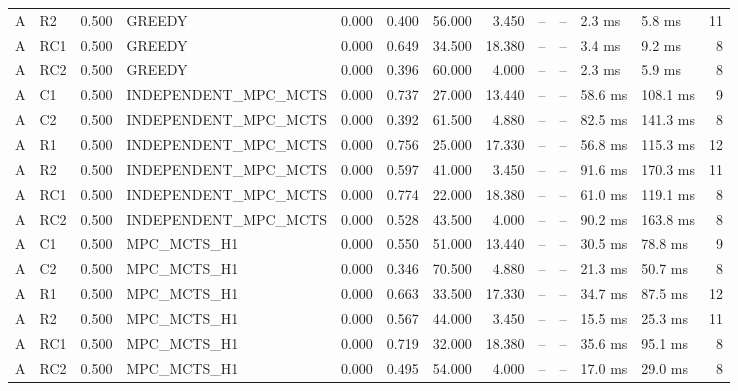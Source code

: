 \begin{table}
{\begin{tabular}{llrlrrrrrrllr}
A & R2 & 0.500 & GREEDY & 0.000 & 0.400 & 56.000 & 3.450 & -- & -- & 2.3 ms & 5.8 ms & 11 \\
A & RC1 & 0.500 & GREEDY & 0.000 & 0.649 & 34.500 & 18.380 & -- & -- & 3.4 ms & 9.2 ms & 8 \\
A & RC2 & 0.500 & GREEDY & 0.000 & 0.396 & 60.000 & 4.000 & -- & -- & 2.3 ms & 5.9 ms & 8 \\
A & C1 & 0.500 & INDEPENDENT\_MPC\_MCTS & 0.000 & 0.737 & 27.000 & 13.440 & -- & -- & 58.6 ms & 108.1 ms & 9 \\
A & C2 & 0.500 & INDEPENDENT\_MPC\_MCTS & 0.000 & 0.392 & 61.500 & 4.880 & -- & -- & 82.5 ms & 141.3 ms & 8 \\
A & R1 & 0.500 & INDEPENDENT\_MPC\_MCTS & 0.000 & 0.756 & 25.000 & 17.330 & -- & -- & 56.8 ms & 115.3 ms & 12 \\
A & R2 & 0.500 & INDEPENDENT\_MPC\_MCTS & 0.000 & 0.597 & 41.000 & 3.450 & -- & -- & 91.6 ms & 170.3 ms & 11 \\
A & RC1 & 0.500 & INDEPENDENT\_MPC\_MCTS & 0.000 & 0.774 & 22.000 & 18.380 & -- & -- & 61.0 ms & 119.1 ms & 8 \\
A & RC2 & 0.500 & INDEPENDENT\_MPC\_MCTS & 0.000 & 0.528 & 43.500 & 4.000 & -- & -- & 90.2 ms & 163.8 ms & 8 \\
A & C1 & 0.500 & MPC\_MCTS\_H1 & 0.000 & 0.550 & 51.000 & 13.440 & -- & -- & 30.5 ms & 78.8 ms & 9 \\
A & C2 & 0.500 & MPC\_MCTS\_H1 & 0.000 & 0.346 & 70.500 & 4.880 & -- & -- & 21.3 ms & 50.7 ms & 8 \\
A & R1 & 0.500 & MPC\_MCTS\_H1 & 0.000 & 0.663 & 33.500 & 17.330 & -- & -- & 34.7 ms & 87.5 ms & 12 \\
A & R2 & 0.500 & MPC\_MCTS\_H1 & 0.000 & 0.567 & 44.000 & 3.450 & -- & -- & 15.5 ms & 25.3 ms & 11 \\
A & RC1 & 0.500 & MPC\_MCTS\_H1 & 0.000 & 0.719 & 32.000 & 18.380 & -- & -- & 35.6 ms & 95.1 ms & 8 \\
A & RC2 & 0.500 & MPC\_MCTS\_H1 & 0.000 & 0.495 & 54.000 & 4.000 & -- & -- & 17.0 ms & 29.0 ms & 8 \\
\bottomrule
\end{tabular}
}
\end{table}
